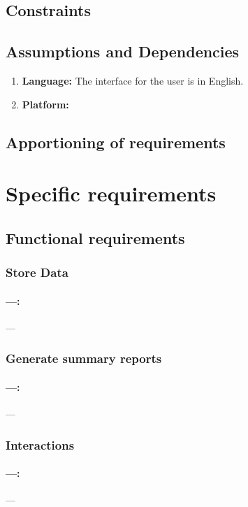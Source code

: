 \documentclass[12pt,a4paper]{article}
\begin{document}
\subsection{Constraints}

\subsection{Assumptions and Dependencies}
\begin{enumerate}
\item \textbf{Language:} The interface for the user is in English.
\item \textbf{Platform:} 
\end{enumerate}

\subsection{Apportioning of requirements}

\section{Specific requirements}

\subsection{Functional requirements}

\subsubsection{Store Data}
\paragraph{---:} ---

\subsubsection{Generate summary reports}
\paragraph{---:} ---

\subsubsection{Interactions}
\paragraph{---:} ---
\end{document}
